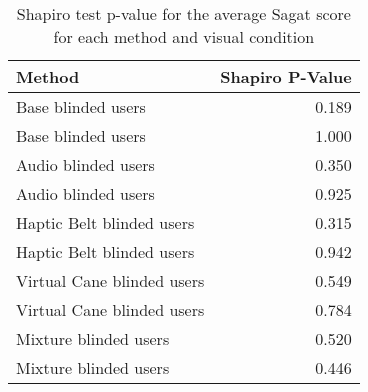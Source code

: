 
\begin{table}[!htb]
\centering
\caption{Shapiro test p-value for the average Sagat score for each method and visual condition}
\label{tab:shapiro_sagat_score_avg}
\begin{tabular}{lr}
\toprule
                    Method &  Shapiro P-Value \\
\midrule
        Base blinded users &            0.189 \\
        Base blinded users &            1.000 \\
       Audio blinded users &            0.350 \\
       Audio blinded users &            0.925 \\
 Haptic Belt blinded users &            0.315 \\
 Haptic Belt blinded users &            0.942 \\
Virtual Cane blinded users &            0.549 \\
Virtual Cane blinded users &            0.784 \\
     Mixture blinded users &            0.520 \\
     Mixture blinded users &            0.446 \\
\bottomrule
\end{tabular}
\end{table}

